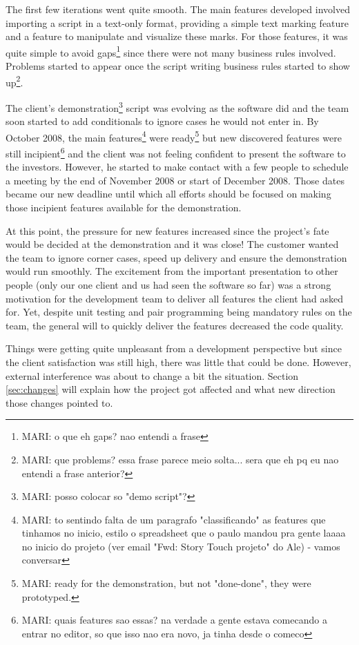 \documentclass[lnbip]{svmultln}
\newcommand{\mari}[1]{\footnote{MARI: #1}}
\begin{document}
The first few iterations went quite smooth. The main features
developed involved importing a script in a text-only format, providing
a simple text marking feature and a feature to manipulate and
visualize these marks. For those features, it was quite simple to
avoid gaps\mari{o que eh gaps? nao entendi a frase} since there were
not many business rules involved. Problems started to appear once the
script writing business rules started to show up\mari{que problems?
  essa frase parece meio solta... sera que eh pq eu nao entendi a
  frase anterior?}.

The client's demonstration\mari{posso colocar so "demo script"?}
script was evolving as the software did and the team soon started to
add conditionals to ignore cases he would not enter in. By October
2008, the main features\mari{to sentindo falta de um paragrafo
  "classificando" as features que tinhamos no inicio, estilo o
  spreadsheet que o paulo mandou pra gente laaaa no inicio do projeto
  (ver email "Fwd: Story Touch projeto" do Ale) - vamos conversar}
were ready\mari{ready for the demonstration, but not "done-done", they
  were prototyped.} but new discovered features were still
incipient\mari{quais features sao essas? na verdade a gente estava
  comecando a entrar no editor, so que isso nao era novo, ja tinha
  desde o comeco} and the client was not feeling confident to present
the software to the investors. However, he started to make contact
with a few people to schedule a meeting by the end of November 2008 or
start of December 2008. Those dates became our new deadline until
which all efforts should be focused on making those incipient features
available for the demonstration.

At this point, the pressure for new features increased since the
project's fate would be decided at the demonstration and it was close!
The customer wanted the team to ignore corner cases, speed up delivery
and ensure the demonstration would run smoothly. The excitement from
the important presentation to other people (only our one client and us
had seen the software so far) was a strong motivation for the
development team to deliver all features the client had asked
for. Yet, despite unit testing and pair programming being mandatory
rules on the team, the general will to quickly deliver the features
decreased the code quality.

Things were getting quite unpleasant from a development perspective
but since the client satisfaction was still high, there was little
that could be done. However, external interference was about to change
a bit the situation. Section \ref{sec:changes} will explain how the
project got affected and what new direction those changes pointed to.
\end{document}
